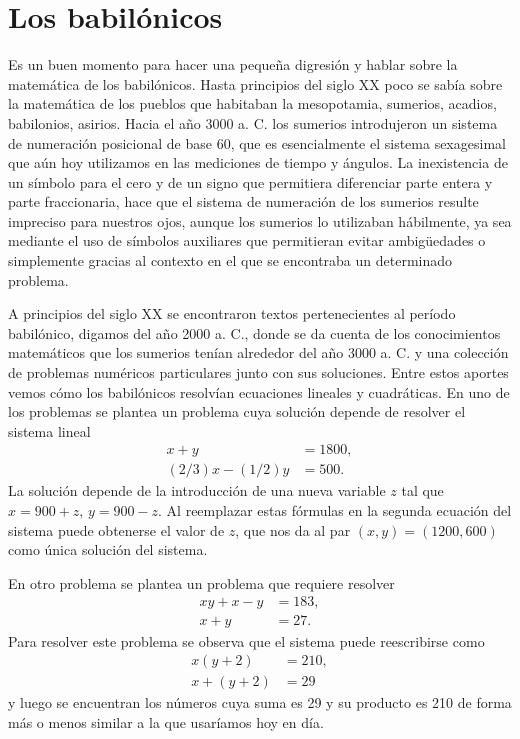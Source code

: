 \section*{Los babilónicos}

Es un buen momento para hacer una pequeña digresión y hablar sobre la
matemática de los babilónicos.  Hasta principios del siglo XX poco se sabía
sobre la matemática de los pueblos que habitaban la mesopotamia, sumerios,
acadios, babilonios, asirios. Hacia el año 3000 a. C. los sumerios introdujeron
un sistema de numeración posicional de base 60, que es esencialmente el sistema
sexagesimal que aún hoy utilizamos en las mediciones de tiempo y ángulos. La
inexistencia de un símbolo para el cero y de un signo que permitiera
diferenciar parte entera y parte fraccionaria, hace que el sistema de
numeración de los sumerios resulte impreciso para nuestros ojos, aunque los
sumerios lo utilizaban hábilmente, ya sea mediante el uso de símbolos
auxiliares que permitieran evitar ambigüedades o simplemente gracias al
contexto en el que se encontraba un determinado problema. 

A principios del siglo XX se encontraron textos pertenecientes al período
babilónico, digamos del año 2000 a. C., donde se da cuenta de los conocimientos
matemáticos que los sumerios tenían alrededor del año 3000 a. C. y una
colección de problemas numéricos particulares junto con sus soluciones. Entre
estos aportes vemos cómo los babilónicos resolvían ecuaciones lineales y
cuadráticas. 
En uno de los problemas se plantea un problema cuya solución depende de resolver
el sistema lineal
\begin{align*}
	x+y &= 1800,\\
	(2/3)x-(1/2)y&=500.
\end{align*}
La solución depende de la introducción de una nueva variable $z$ tal que
$x=900+z$, $y=900-z$. Al reemplazar estas fórmulas en la segunda ecuación del
sistema puede obtenerse el valor de $z$, que nos da al par $(x,y)=(1200,600)$
como única solución del sistema. 

En otro problema se plantea un problema que requiere resolver 
\begin{align*}
	xy+x-y &= 183,\\
	x+y&=27.
\end{align*}
Para resolver este problema se observa que el sistema puede reescribirse como 
\begin{align*}
	x(y+2)&=210,\\
	x+(y+2)&=29
\end{align*}
y luego se encuentran los números cuya suma es 29 y su producto es 210 de forma
más o menos similar a la que usaríamos hoy en día.

